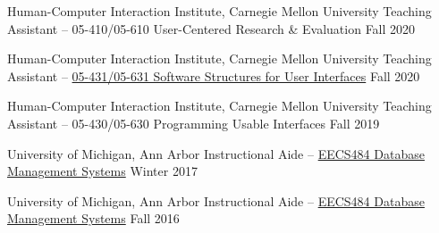 





\begin{cvteachingexps}

  \cvteachingexp
    {Human-Computer Interaction Institute, Carnegie Mellon University} %
    {Teaching Assistant – 05-410/05-610 User-Centered Research \& Evaluation} %
    {Fall 2020} %
    {
      ~  %
    } %
  
  \cvteachingexp
    {Human-Computer Interaction Institute, Carnegie Mellon University} %
    {Teaching Assistant – \href{https://www.cs.cmu.edu/~bam/uicourse/05631fall2020/}{05-431/05-631 Software Structures for User Interfaces}} %
    {Fall 2020} %
    {
      ~  %
    } %

  \cvteachingexp
    {Human-Computer Interaction Institute, Carnegie Mellon University} %
    {Teaching Assistant – 05-430/05-630 Programming Usable Interfaces} %
    {Fall 2019} %
    {
      ~%
    } %
    

  \cvteachingexp
    {University of Michigan, Ann Arbor} %
    {Instructional Aide – \href{https://docs.google.com/document/d/1tn3SMN37z4f_Q8Sey-oe9LuZKh9AMctI7B4HO-zs-F4/edit?usp=sharing}{EECS484 Database Management Systems}} %
    {Winter 2017} %
    {
      ~%
    } %
  
  \cvteachingexp
    {University of Michigan, Ann Arbor} %
    {Instructional Aide – \href{http://web.eecs.umich.edu/~aprakash/eecs484/index.html}{EECS484 Database Management Systems}} %
    {Fall 2016} %
    {
      ~%
    } %


\end{cvteachingexps}
